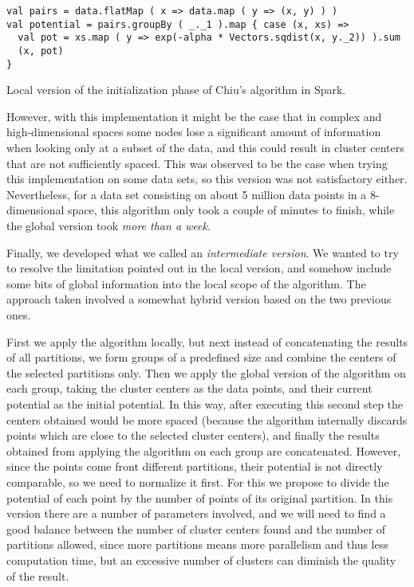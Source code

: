 \begin{Listing}[h!]
\begin{lstlisting}[basicstyle=\normalsize\ttfamily, xleftmargin=.5cm, aboveskip=0em, belowskip=0em]
val pairs = data.flatMap ( x => data.map ( y => (x, y) ) )
val potential = pairs.groupBy ( _._1 ).map { case (x, xs) =>
  val pot = xs.map ( y => exp(-alpha * Vectors.sqdist(x, y._2)) ).sum
  (x, pot)
}
\end{lstlisting}
\caption{Local version of the initialization phase of Chiu's algorithm in Spark.}
  \label{lst:chiu-local}
\end{Listing}

However, with this implementation it might be the case that in complex and high-dimensional spaces some nodes lose a significant amount of information when looking only at a subset of the data, and this could result in cluster centers that are not sufficiently spaced. This was observed to be the case when trying this implementation on some data sets, so this version was not satisfactory either. Nevertheless, for a data set consisting on about 5 million data points in a 8-dimensional space, this algorithm only took a couple of minutes to finish, while the global version took \textit{more than a week}.

Finally, we developed what we called an \textit{intermediate version}. We wanted to try to resolve the limitation pointed out in the local version, and somehow include some bits of global information into the local scope of the algorithm. The approach taken involved a somewhat hybrid version based on the two previous ones.

First we apply the algorithm locally, but next instead of concatenating the results of all partitions, we form groups of a predefined size and combine the centers of the selected partitions only. Then we apply the global version of the algorithm on each group, taking the cluster centers as the data points, and their current potential as the initial potential. In this way, after executing this second step the centers obtained would be more spaced (because the algorithm internally discards points which are close to the selected cluster centers), and finally the results obtained from applying the algorithm on each group are concatenated. However, since the points come front different partitions, their potential is not directly comparable, so we need to normalize it first. For this we propose to divide the potential of each point by the number of points of its original partition. In this version there are a number of parameters involved, and we will need to find a good balance between the number of cluster centers found and the number of partitions allowed, since more partitions means more parallelism and thus less computation time, but an excessive number of clusters can diminish the quality of the result.

